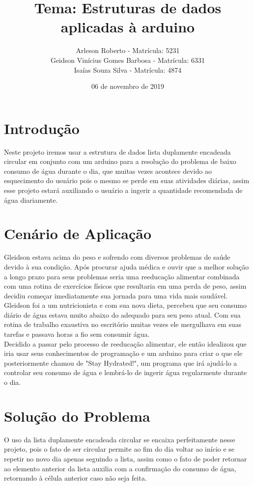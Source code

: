 \documentclass[a4paper]{article}
\title{Tema: Estruturas de dados aplicadas à arduino}
\author{Arleson Roberto - Matrícula: 5231  \\ Geidson Vinícius Gomes Barbosa - Matrícula: 6331 \\ Isaías Souza Silva - Matrícula: 4874 }
\date{06 de novembro de 2019}
\begin{document}
\maketitle

\section{Introdução}
Neste projeto iremos usar a estrutura de dados lista duplamente encadeada circular em conjunto com um arduino para a resolução do problema de baixo consumo de água durante o dia, que muitas vezes acontece devido ao esquecimento do usuário pois o mesmo se perde em suas atividades diárias, assim esse projeto estará auxiliando o usuário a ingerir a quantidade recomendada de água diariamente.

\section{Cenário de Aplicação}
Gleidson estava acima do peso e sofrendo com diversos problemas de saúde devido à sua condição. Após procurar ajuda médica e ouvir que a melhor solução a longo prazo para seus problemas seria uma reeducação alimentar combinada com uma rotina de exercícios físicos que resultaria em uma perda de peso, assim decidiu começar imediatamente sua jornada para uma vida mais saudável. Gleidson foi a um nutricionista e com sua nova dieta, percebeu que seu consumo diário de água estava muito abaixo do adequado para seu peso atual. Com sua rotina de trabalho exaustiva no escritório muitas vezes ele mergulhava em suas tarefas e passava horas a fio sem consumir água.\\Decidido a passar pelo processo de reeducação alimentar, ele então idealizou que iria usar seus conhecimentos de programação e um arduino para criar o que ele posteriormente chamou de "Stay Hydrated!", um programa que irá ajudá-lo a controlar seu consumo de água e lembrá-lo de ingerir água regularmente durante o dia. 


\section{Solução do Problema}
O uso da lista duplamente encadeada circular se encaixa perfeitamente nesse projeto, pois o fato de ser circular permite ao fim do dia voltar ao início e se repetir no novo dia apenas seguindo a lista, assim como o fato de poder retornar ao elemento anterior da lista auxilia com a confirmação do consumo de água, retornando à célula anterior caso não seja feita.
\end{document}
